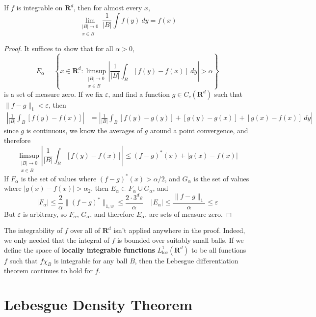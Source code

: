 \begin{theorem}
    If $f$ is integrable on $\mathbf{R}^d$, then for almost every $x$,
    \[ \lim_{\substack{|B| \to 0\\x \in B}} \frac{1}{|B|} \int f(y)\ dy = f(x) \]
\end{theorem}
\begin{proof}
    It suffices to show that for all $\alpha > 0$,
    \[ E_\alpha = \left\{ x \in \mathbf{R}^d: \limsup_{\substack{|B| \to 0\\x \in B}} \left| \frac{1}{|B|} \int_B [f(y) - f(x)]\ dy \right| > \alpha \right\} \]
    is a set of measure zero. If we fix $\varepsilon$, and find a function $g \in C_c(\mathbf{R}^d)$ such that $\| f - g \|_1 < \varepsilon$, then
    \begin{align*}
        \left| \frac{1}{|B|} \int_B [f(y) - f(x)] \right| &= \left| \frac{1}{|B|} \int_B [f(y) - g(y)] + [g(y) - g(x)] + [g(x) - f(x)]\ dy \right|
    \end{align*}
    since $g$ is continuous, we know the averages of $g$ around a point convergence, and therefore
    \[ \limsup_{\substack{|B| \to 0\\ x \in B}} \left| \frac{1}{|B|} \int_B [f(y) - f(x)] \right| \leq (f - g)^*(x) + |g(x) - f(x)| \]
    If $F_\alpha$ is the set of values where $(f - g)^*(x) > \alpha/2$, and $G_\alpha$ is the set of values where $|g(x) - f(x)| > \alpha_2$, then $E_\alpha \subset F_\alpha \cup G_\alpha$, and
    \[ |F_\alpha| \leq \frac{2}{\alpha} \| (f - g)^* \|_{1,w} \leq \frac{2 \cdot 3^d \varepsilon}{\alpha} \ \ \ \ \ |E_\alpha| \leq \frac{\| f - g \|_1}{\alpha} \leq \varepsilon \]
    But $\varepsilon$ is arbitrary, so $F_\alpha$, $G_\alpha$, and therefore $E_\alpha$, are sets of measure zero.
\end{proof}

The integrability of $f$ over all of $\mathbf{R}^d$ isn't applied anywhere in the proof. Indeed, we only needed that the integral of $f$ is bounded over suitably small balls. If we define the space of {\bf locally integrable functions} $L^1_{\text{loc}}(\mathbf{R}^d)$ to be all functions $f$ such that $f \chi_B$ is integrable for any ball $B$, then the Lebesgue differentiation theorem continues to hold for $f$.

\section{Lebesgue Density Theorem}

